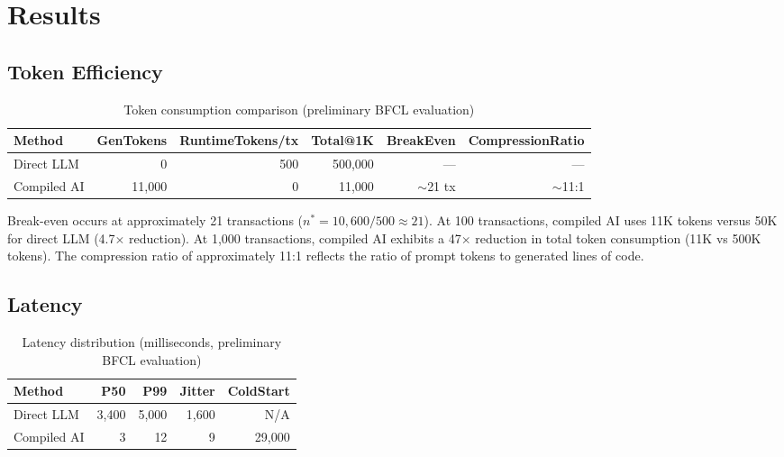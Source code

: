 \documentclass[11pt]{article}
\begin{document}
\section{Results}
\label{sec:results}

\subsection{Token Efficiency}

\begin{table}[ht]
\centering
\caption{Token consumption comparison (preliminary BFCL evaluation)}
\label{tab:token-results}
\begin{tabular}{lrrrrr}
\toprule
Method & GenTokens & RuntimeTokens/tx & Total@1K & BreakEven & CompressionRatio \\
\midrule
Direct LLM & 0 & 500 & 500,000 & --- & --- \\
Compiled AI & 11,000 & 0 & 11,000 & $\sim$21 tx & $\sim$11:1 \\
\bottomrule
\end{tabular}
\end{table}

Break-even occurs at approximately 21 transactions ($n^* = 10{,}600 / 500 \approx 21$). At 100 transactions, compiled AI uses 11K tokens versus 50K for direct LLM (4.7$\times$ reduction). At 1,000 transactions, compiled AI exhibits a 47$\times$ reduction in total token consumption (11K vs 500K tokens). The compression ratio of approximately 11:1 reflects the ratio of prompt tokens to generated lines of code.

\subsection{Latency}

\begin{table}[ht]
\centering
\caption{Latency distribution (milliseconds, preliminary BFCL evaluation)}
\label{tab:latency-results}
\begin{tabular}{lrrrr}
\toprule
Method & P50 & P99 & Jitter & ColdStart \\
\midrule
Direct LLM & 3,400 & 5,000 & 1,600 & N/A \\
Compiled AI & 3 & 12 & 9 & 29,000 \\
\bottomrule
\end{tabular}
\end{table}
\end{document}
